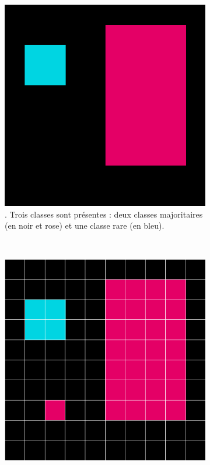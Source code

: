 \begin{figure}[htb]
	\centering
	 \begin{subfigure}[t]{0.45\textwidth}	
			\includegraphics[width=\textwidth]{images/saf/ex_f_reg_im}
		 \caption{. Trois classes sont présentes : deux classes majoritaires (en noir et rose) et une classe rare (en bleu). }
	\end{subfigure}		
	~
	 \begin{subfigure}[t]{0.45\textwidth}	
			\includegraphics[width=\textwidth]{images/saf/ex_f_reg_seg}

\end{subfigure}
\end{figure}
